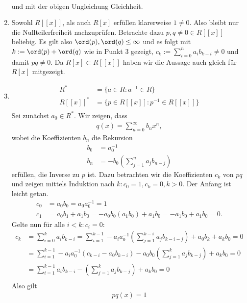 \begin{solution}
\begin{enumerate}
\begin{align*}
  \end{align*}
  und mit der obigen Ungleichung Gleichheit.
  \item Sowohl $R[[x]]$, als auch $R[x]$ erfüllen klarerweise $1 \neq 0$.
  Also bleibt nur die Nullteilerfreiheit nachzuprüfen. Betrachte dazu
  $p,q \neq 0 \in R[[x]]$ beliebig. Es gilt also $\ord(p), \ord(q) \leq \infty$
  und es folgt mit $k := \ord(p) + \ord(q)$ wie in Punkt 3 gezeigt,
  $c_k := \sum_{i=0}^n a_ib_{k-i} \neq 0$ und damit $pq \neq 0$.
  Da $R[x] \subset R[[x]]$ haben wir die Aussage auch gleich für $R[x]$
  mitgezeigt.
  \item \begin{align*}
    R^* &= \{a \in R: a^{-1} \in R\} \\
    R[[x]]^* &= \{p \in R[[x]]: p^{-1} \in R[[x]]\} \\
  \end{align*}
  Sei zunächst $a_0 \in R^*$. Wir zeigen, dass
  \begin{align*}
    q(x) = \sum_{n=0}^{\infty}b_nx^n,
  \end{align*}
  wobei die Koeffizienten $b_n$ die Rekursion
  \begin{align*}
    b_0 &= a_0^{-1} \\
    b_n &= -b_0\left(\sum_{j=1}^na_jb_{n-j}\right)
  \end{align*}
  erfüllen, die Inverse zu $p$ ist. Dazu betrachten wir die Koeffizienten $c_k$
  von $pq$ und zeigen mittels Induktion nach $k: c_0 = 1, c_k = 0, k > 0$. Der Anfang ist leicht getan.
  \begin{align*}
    c_0 &= a_0b_0 = a_0a_0^{-1} = 1 \\
    c_1 &= a_0b_1 + a_1b_0 = -a_0b_0(a_1b_0) + a_1b_0 = -a_1b_0 + a_1b_0 = 0.
  \end{align*}
  Gelte nun für alle $i < k: c_i = 0$:
  \begin{align*}
    c_k &= \sum_{i=0}^{k} a_i b_{k-i}
    = \sum_{i=1}^{k-1} -a_ia_0^{-1}\left(\sum_{j=1}^{k-i}a_jb_{k-i-j}\right) + a_0b_k + a_kb_0 = 0 \\
    &= \sum_{i=1}^{k-1} -a_ia_0^{-1}\left(c_{k-i} - a_0b_{k-i}\right) - a_0b_0\left(\sum_{j=1}^ka_jb_{k-j}\right) + a_kb_0 = 0 \\
    &= \sum_{i=1}^{k-1} a_ib_{k-i} - \left(\sum_{j=1}^ka_jb_{k-j}\right) + a_kb_0 = 0 \\
  \end{align*}
  Also gilt
  \begin{align*}
    pq(x) = 1
  \end{align*}

\end{enumerate}
\end{solution}
